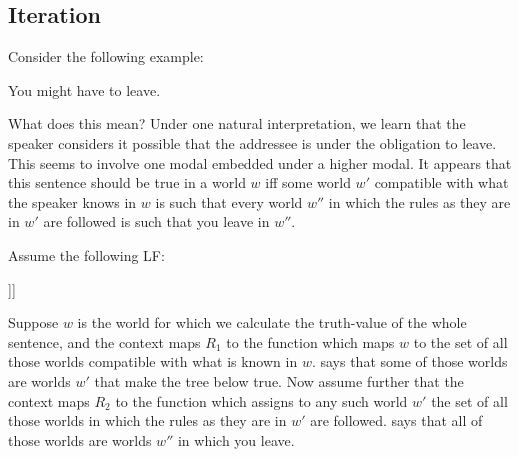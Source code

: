\subsection{Iteration}

Consider the following example: 

\ex You might have to leave. \xe

What does this mean? Under one natural interpretation, we learn that
the speaker considers it possible that the addressee is under the
obligation to leave. This seems to involve one modal embedded under a
higher modal. %
%
It appears that this sentence should be true in a world $w$ iff some
world $w'$ compatible with what the speaker knows in $w$ is such that
every world $w''$ in which the rules as they are in $w'$ are followed
is such that you leave in $w''$.

Assume the following LF:

\ex\null [I$'$ [ might $R_{\angles{1,\angles{s,st}}}$] [VP [ have-to
$R_{\angles{2,\angles{s,st}}}$] [IP you leave]]] \xe

Suppose $w$ is the world for which we calculate the truth-value of %
%
the whole sentence, and the context maps $R_1$ to the function which maps
$w$ to the set of all those worlds compatible with what is known in
$w$.  says that some of those worlds are worlds $w'$
that make the tree below  true. Now assume further
that the context maps $R_2$ to the function which assigns to any such
world $w'$ the set of all those worlds in which the rules as they are
in $w'$ are followed.  says that all of those
worlds are worlds $w''$ in which you leave.

